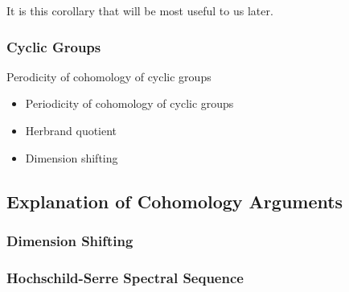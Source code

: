 It is this corollary that will be most useful to us later.

\subsubsection{Cyclic Groups}

\begin{lemma} \label{lem:cohom:cycl}
	Perodicity of cohomology of cyclic groups
\end{lemma}

\begin{itemize}
	\item Periodicity of cohomology of cyclic groups
	\item Herbrand quotient
	\item Dimension shifting
\end{itemize}

\subsection{Explanation of Cohomology Arguments}

\subsubsection{Dimension Shifting}


\subsubsection{Hochschild-Serre Spectral Sequence}

